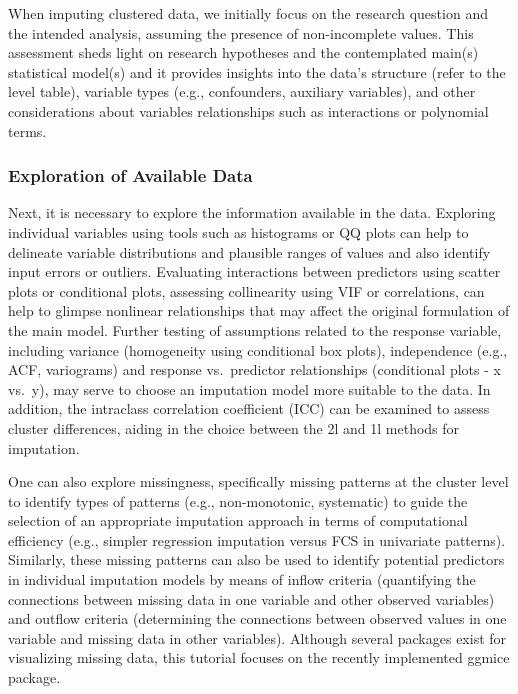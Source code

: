 \documentclass[
]{jss}
\begin{document}
When imputing clustered data, we initially focus on the research
question and the intended analysis, assuming the presence of
non-incomplete values. This assessment sheds light on research
hypotheses and the contemplated main(s) statistical model(s) and it
provides insights into the data's structure (refer to the level table),
variable types (e.g., confounders, auxiliary variables), and other
considerations about variables relationships such as interactions or
polynomial terms.

\hypertarget{exploration-of-available-data}{%
\subsubsection{Exploration of Available
Data}\label{exploration-of-available-data}}

Next, it is necessary to explore the information available in the data.
Exploring individual variables using tools such as histograms or QQ
plots can help to delineate variable distributions and plausible ranges
of values and also identify input errors or outliers. Evaluating
interactions between predictors using scatter plots or conditional
plots, assessing collinearity using VIF or correlations, can help to
glimpse nonlinear relationships that may affect the original formulation
of the main model. Further testing of assumptions related to the
response variable, including variance (homogeneity using conditional box
plots), independence (e.g., ACF, variograms) and response vs.~predictor
relationships (conditional plots - x vs.~y), may serve to choose an
imputation model more suitable to the data. In addition, the intraclass
correlation coefficient (ICC) can be examined to assess cluster
differences, aiding in the choice between the 2l and 1l methods for
imputation.

One can also explore missingness, specifically missing patterns at the
cluster level to identify types of patterns (e.g., non-monotonic,
systematic) to guide the selection of an appropriate imputation approach
in terms of computational efficiency (e.g., simpler regression
imputation versus FCS in univariate patterns). Similarly, these missing
patterns can also be used to identify potential predictors in individual
imputation models by means of inflow criteria (quantifying the
connections between missing data in one variable and other observed
variables) and outflow criteria (determining the connections between
observed values in one variable and missing data in other variables).
Although several packages exist for visualizing missing data, this
tutorial focuses on the recently implemented ggmice package.
\end{document}
